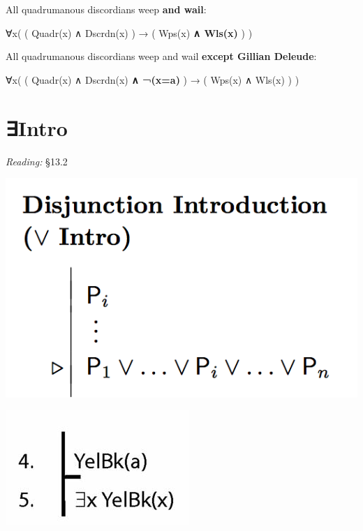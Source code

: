 \documentclass[12pt]{extarticle}
\begin{document}
\begin{multicols*}{3}
\begin{minipage}{\columnwidth}
 
All quadrumanous discordians weep \textbf{and wail}:
 
∀x( ( Quadr(x) ∧ Dscrdn(x) ) → ( Wps(x) \textbf{ ∧ Wls(x)} ) )
 
\end{minipage}
 
\begin{minipage}{\columnwidth}
 
All quadrumanous discordians weep and wail \textbf{except Gillian Deleude}:
 
∀x( ( Quadr(x) ∧ Dscrdn(x) \textbf{∧ ¬(x=a)} ) → ( Wps(x) ∧ Wls(x) ) )
 
\end{minipage}
 
 
 
\section{∃Intro}
 
\emph{Reading:} §13.2
 
\begin{center}
\includegraphics[scale=0.3]{img/rule_disjunction_intro.png}
\end{center}
\begin{center}
\includegraphics[scale=0.3]{img/unit_801_proof.png}
\end{center}
 

\end{multicols*}
\end{document}

